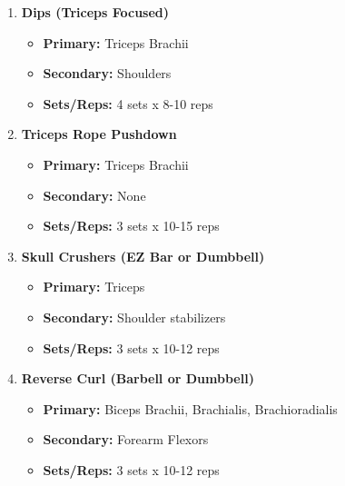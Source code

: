 \documentclass{article}
\begin{document}
\begin{enumerate}[label=\arabic*., wide=0pt, leftmargin=*]
    \item \textbf{Dips (Triceps Focused)}
        \begin{itemize}[label=\textbullet, leftmargin=*, nosep, topsep=0pt, partopsep=0pt]
            \item \textbf{Primary:} Triceps Brachii
            \item \textbf{Secondary:} Shoulders
            \item \textbf{Sets/Reps:} 4 sets x 8-10 reps
        \end{itemize}

    \item \textbf{Triceps Rope Pushdown}
        \begin{itemize}[label=\textbullet, leftmargin=*, nosep, topsep=0pt, partopsep=0pt]
            \item \textbf{Primary:} Triceps Brachii
            \item \textbf{Secondary:} None
            \item \textbf{Sets/Reps:} 3 sets x 10-15 reps
        \end{itemize}

    \item \textbf{Skull Crushers (EZ Bar or Dumbbell)}
        \begin{itemize}[label=\textbullet, leftmargin=*, nosep, topsep=0pt, partopsep=0pt]
            \item \textbf{Primary:} Triceps
            \item \textbf{Secondary:} Shoulder stabilizers
            \item \textbf{Sets/Reps:} 3 sets x 10-12 reps
        \end{itemize}

    \item \textbf{Reverse Curl (Barbell or Dumbbell)}
        \begin{itemize}[label=\textbullet, leftmargin=*, nosep, topsep=0pt, partopsep=0pt]
            \item \textbf{Primary:} Biceps Brachii, Brachialis, Brachioradialis
            \item \textbf{Secondary:} Forearm Flexors
            \item \textbf{Sets/Reps:} 3 sets x 10-12 reps
        \end{itemize}
\end{enumerate}
\end{document}
